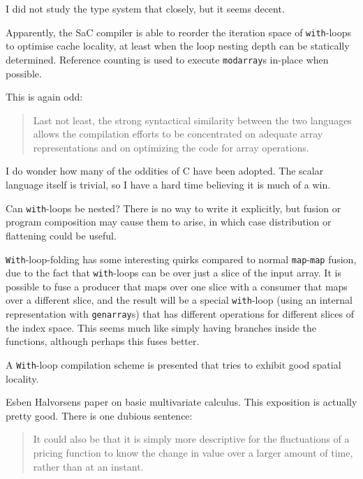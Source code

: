 \documentclass[a4paper, oneside, final]{memoir}
\begin{document}
I did not study the type system that closely, but it seems decent.

Apparently, the SaC compiler is able to reorder the iteration space of
\texttt{with}-loops to optimise cache locality, at least when the loop
nesting depth can be statically determined.  Reference counting is
used to execute \texttt{modarray}s in-place when possible.

This is again odd:

\begin{quote}
  Last not least, the strong syntactical similarity between the two
  languages allows the compilation efforts to be concentrated on
  adequate array representations and on optimizing the code for array
  operations.
\end{quote}

I do wonder how many of the oddities of C have been adopted.  The
scalar language itself is trivial, so I have a hard time believing it
is much of a win.

Can \texttt{with}-loops be nested?  There is no way to write it
explicitly, but fusion or program composition may cause them to arise,
in which case distribution or flattening could be useful.

\texttt{With}-loop-folding has some interesting quirks compared to
normal \texttt{map}-\texttt{map} fusion, due to the fact that
\texttt{with}-loops can be over just a slice of the input array.  It
is possible to fuse a producer that maps over one slice with a
consumer that maps over a different slice, and the result will be a
special \texttt{with}-loop (using an internal representation with
\texttt{genarray}s) that has different operations for different slices
of the index space.  This seems much like simply having branches
inside the functions, although perhaps this fuses better.

A \texttt{With}-loop compilation scheme is presented that tries to
exhibit good spatial locality.

\begin{quote}
\end{quote}

Esben Halvorsens paper on basic multivariate calculus.  This
exposition is actually pretty good.  There is one dubious sentence:

\begin{quote}
  It could also be that it is simply more descriptive for the
  fluctuations of a pricing function to know the change in value over
  a larger amount of time, rather than at an instant.
\end{quote}
\end{document}
